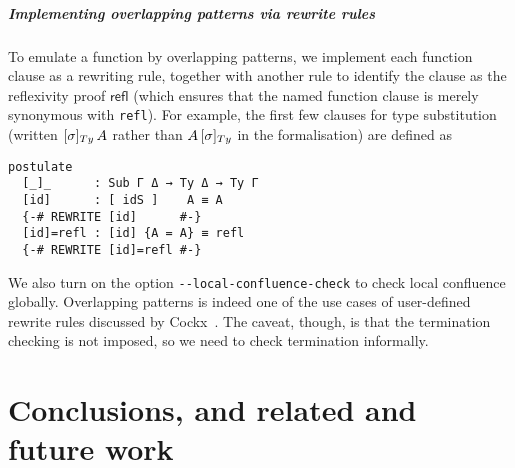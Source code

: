 \documentclass[a4paper,UKenglish,numberwithinsect,cleveref,thm-restate]{lipics-v2021}
\newcommand{\LT}[2][]{\todo[inline,author={L-T},caption={},color={pink},#1]{#2}}
\begin{document}
\subparagraph*{Implementing overlapping patterns via rewrite rules}
To emulate a function by overlapping patterns, we implement each function clause as a rewriting rule, together with another rule to identify the clause as the reflexivity proof $\mathsf{refl}$ (which ensures that the named function clause is merely synonymous with \lstinline|refl|).
For example, the first few clauses for type substitution (written $[\sigma]_{\Ty}\,A$ rather than $\subTy{A}{\sigma}$ in the formalisation) are defined as
\begin{lstlisting}
postulate
  [_]_      : Sub Γ Δ → Ty Δ → Ty Γ
  [id]      : [ idS ]    A ≡ A
  {-# REWRITE [id]      #-}
  [id]=refl : [id] {A = A} ≡ refl
  {-# REWRITE [id]=refl #-}
\end{lstlisting}
We also turn on the option \texttt{-{}-local-confluence-check} to check local confluence globally.
%
Overlapping patterns is indeed one of the use cases of user-defined rewrite rules discussed by Cockx~\cite{Cockx2020}.
The caveat, though, is that the termination checking is not imposed, so we need to check termination informally.

%
% 
%

\section{Conclusions, and related and future work}\label{sec:conclusion}
\end{document}

